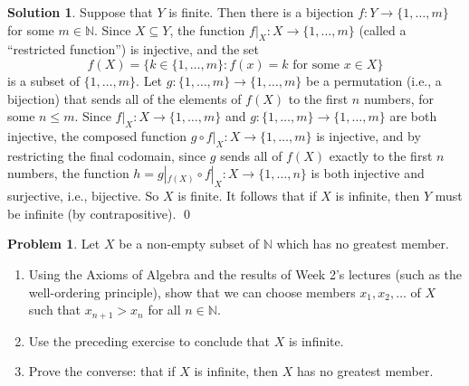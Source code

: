 \documentclass{article}
\numberwithin{equation}{section}
\theoremstyle{plain}
\theoremstyle{definition}
\newtheorem{problem}{Problem}
\newtheorem*{solution*}{Solution}
\newcommand{\N}{\mathbb N}
\begin{document}
\begin{solution*}
	Suppose that $Y$ is finite. Then there is a bijection $f : Y \to \{1, \ldots, m\}$ for some $m \in \N$. Since $X \subseteq Y$, the function $f|_X : X \to \{1, \ldots, m\}$ (called a ``restricted function'') is injective, and the set $$f(X) = \{k \in \{1, \ldots, m\} : f(x) = k \textrm{ for some } x \in X\}$$ is a subset of $\{1, \ldots, m\}$. Let $g : \{1, \ldots, m\} \to \{1, \ldots, m\}$ be a permutation (i.e., a bijection) that sends all of the elements of $f(X)$ to the first $n$ numbers, for some $n \leq m$. Since $f|_X : X \to \{1, \ldots, m\}$ and $g : \{1, \ldots, m\} \to \{1, \ldots, m\}$ are both injective, the composed function $g \circ f|_X : X \to \{1, \ldots, m\}$ is injective, and by restricting the final codomain, since $g$ sends all of $f(X)$ exactly to the first $n$ numbers, the function $h = g|_{f(X)} \circ f|_X : X \to \{1, \ldots, n\}$ is both injective and surjective, i.e., bijective. So $X$ is finite. It follows that if $X$ is infinite, then $Y$ must be infinite (by contrapositive). \qed
\end{solution*}

\begin{problem}
	Let $X$ be a non-empty subset of $\N$ which has no greatest member. 
	\begin{enumerate}[label=(\alph*)] 
		\item Using the Axioms of Algebra and the results of Week 2's lectures (such as the well-ordering principle), show that we can choose members $x_1, x_2, \ldots$ of $X$ such that $x_{n+1} > x_n$ for all $n \in \N$. 
		\item Use the preceding exercise to conclude that $X$ is infinite. 
		\item Prove the converse: that if $X$ is infinite, then $X$ has no greatest member. 
	\end{enumerate}
\end{problem}
\end{document}
